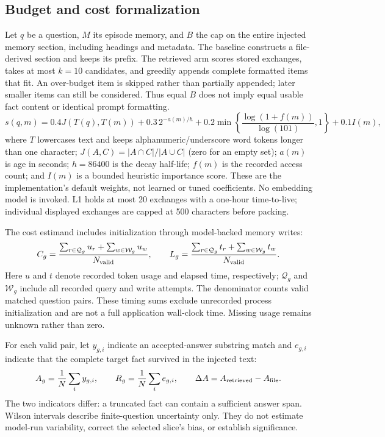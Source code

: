 \FloatBarrier

\subsection{Budget and cost formalization}
Let $q$ be a question, $M$ its episode memory, and $B$ the cap on the entire
injected memory section, including headings and metadata. The baseline constructs
a file-derived section and keeps its prefix. The retrieved arm scores stored
exchanges, takes at most $k=10$ candidates, and greedily appends complete formatted
items that fit. An over-budget item is skipped rather than partially appended;
later smaller items can still be considered. Thus equal $B$ does not imply equal
usable fact content or identical prompt formatting.
\begin{equation}
  s(q,m)=0.4J(T(q),T(m))+0.3\,2^{-a(m)/h}
       +0.2\min\!\left\{\frac{\log(1+f(m))}{\log(101)},1\right\}+0.1I(m),
  \label{eq:ranking}
\end{equation}
where $T$ lowercases text and keeps alphanumeric/underscore word tokens longer
than one character; $J(A,C)=|A\cap C|/|A\cup C|$ (zero for an empty set);
$a(m)$ is age in seconds; $h=86400$ is the decay half-life; $f(m)$ is the recorded
access count; and $I(m)$ is a bounded heuristic importance score. These are the
implementation's default weights, not learned or tuned coefficients. No embedding
model is invoked. L1 holds at most 20 exchanges with a one-hour time-to-live;
individual displayed exchanges are capped at 500 characters before packing.

The cost estimand includes initialization through model-backed memory writes:
\begin{equation}
 C_g=\frac{\sum_{r\in\mathcal{Q}_g}u_r+
                 \sum_{w\in\mathcal{W}_g}u_w}{N_{\rm valid}},\qquad
 L_g=\frac{\sum_{r\in\mathcal{Q}_g}t_r+
                 \sum_{w\in\mathcal{W}_g}t_w}{N_{\rm valid}}.
 \label{eq:accounting}
\end{equation}
Here $u$ and $t$ denote recorded token usage and elapsed time, respectively;
$\mathcal Q_g$ and $\mathcal W_g$ include all recorded query and write attempts.
The denominator counts valid matched question pairs. These timing sums exclude
unrecorded process initialization and are not a full application wall-clock time.
Missing usage remains unknown rather than zero.

For each valid pair, let $y_{g,i}$ indicate an accepted-answer substring match
and $e_{g,i}$ indicate that the complete target fact survived in the injected text:
\begin{equation}
 A_g=\frac{1}{N}\sum_i y_{g,i},\qquad
 R_g=\frac{1}{N}\sum_i e_{g,i},\qquad
 \Delta A=A_{\rm retrieved}-A_{\rm file}.
 \label{eq:metrics}
\end{equation}
The two indicators differ: a truncated fact can contain a sufficient answer span.
Wilson intervals describe finite-question uncertainty only. They do not estimate
model-run variability, correct the selected slice's bias, or establish significance.

